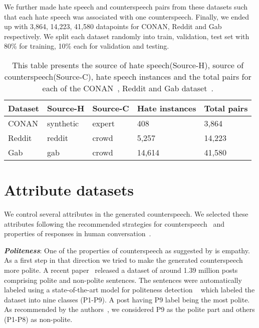We further made hate speech and counterspeech pairs from these datasets such that each hate speech was associated with one counterspeech. Finally, we ended up with 3,864, 14,223, 41,580 datapoints for CONAN, Reddit and Gab respectively. We split each dataset randomly into train, validation, test set with 80\% for training, 10\% each for validation and testing.
\begin{table}[!htpb]
\scriptsize
\centering
\begin{tabular}{|l|l|l|l|l|}
\hline
\textbf{Dataset} & \textbf{Source-H} & \textbf{Source-C} & \textbf{Hate instances} & \textbf{Total pairs} \\ \hline
CONAN       & synthetic     & expert     &   408     &   3,864      \\ 
Reddit      & reddit        & crowd     &   5,257    &   14,223     \\ 
Gab        & gab           & crowd      &   14,614    &   41,580     \\ \hline
\end{tabular}
\caption{\scriptsize{This table presents the source of hate speech(Source-H), source of counterspeech(Source-C), hate speech instances and the total pairs for each of the CONAN~\cite{chung2019conan}, Reddit and Gab dataset~\cite{qian2019benchmark}.}}
\label{tab:cs_dataset}
\end{table}




\section{Attribute datasets}
We control several attributes in the generated counterspeech. We selected these attributes following the recommended strategies for counterspeech~\cite{benesch2016considerations} and properties of responses in human conversation~\cite{10.1145/3290605.3300705}.

\textbf{\textit{Politeness}}: One of the properties of counterspeech as suggested by \citet{benesch2016considerations} is empathy. As a first step in that direction we tried to make the generated counterspeech more polite. A recent paper~\cite{madaan2020politeness} released a dataset of around 1.39 million posts comprising polite and non-polite sentences. The sentences were automatically labeled using a state-of-the-art model for politeness detection ~\cite{niu2018polite} which labeled the dataset into nine classes (P1-P9). A post having P9 label being the most polite. As recommended by the authors~\cite{madaan2020politeness}, we considered P9 as the polite part and others (P1-P8) as non-polite. 

